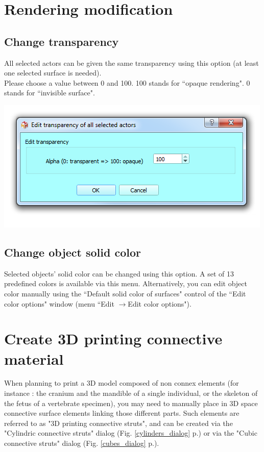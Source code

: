 \section{Rendering modification}



\subsection{Change transparency}
\noindent
\begin{minipage}{0.4\textwidth}
All selected actors can be given the same transparency using this option (at least one selected surface is needed).\\
Please choose a value between 0 and 100. 100 stands for ``opaque rendering". 0 stands for ``invisible surface".\\


\end{minipage}    
\begin{minipage}{0.6\textwidth}\centering
  \includegraphics[scale=0.5]{images/09/rendering/transparency.png}
 \end{minipage} 
\noindent





\subsection{Change object solid color}
Selected objects' solid color can be changed using this option. A set of 13 predefined colors is available via this menu. Alternatively, you can edit object color manually using the ``Default solid color of surfaces" control of the ``Edit color options" window (menu ``Edit $\rightarrow$Edit color options").

\section{Create 3D printing connective material}
When planning to print a 3D model composed of non connex elements (for instance : the cranium and the mandible of a single individual, or the skeleton of the fetus of a vertebrate specimen), you may need to manually place in 3D space connective surface elements linking those different parts. Such elements are referred to as "3D printing connective struts", and can be created via the "Cylindric connective struts" dialog (Fig. \ref{cylinders_dialog} p.\pageref{cylinders_dialog}) or via the "Cubic connective struts" dialog (Fig. \ref{cubes_dialog} p.\pageref{cubes_dialog}). 
